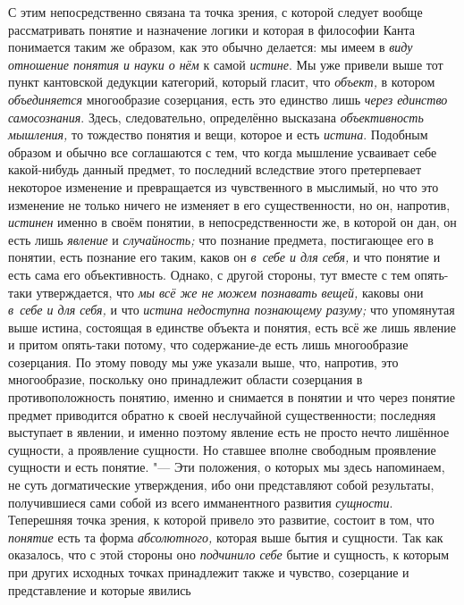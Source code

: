 С этим непосредственно связана та точка зрения, с которой
следует вообще рассматривать понятие и назначение логики и которая в
философии Канта понимается таким же образом, как это обычно делается: мы
имеем в {\em виду отношение понятия и науки о нём} к самой {\em истине}. Мы уже
привели выше тот пункт кантовской дедукции категорий, который гласит, что
{\em объект,} в котором {\em объединяется}
многообразие созерцания, есть это единство лишь
{\em через единство самосознания}. Здесь, следовательно, определённо высказана
{\em объективность мышления,} то тождество понятия и вещи, которое и есть
{\em истина}. Подобным
образом и обычно все соглашаются с тем, что когда мышление усваивает себе
какой-нибудь данный предмет, то последний вследствие этого претерпевает
некоторое изменение и превращается из чувственного в мыслимый, но что это
изменение не только ничего не изменяет в его существенности, но он,
напротив, {\em истинен}
именно в своём понятии, в непосредственности же, в которой он
дан, он есть лишь {\em явление} и {\em случайность;}
что познание предмета, постигающее его в понятии, есть
познание его таким, каков он {\em в~себе
и для себя,} и что понятие и есть сама его объективность.
Однако, с другой стороны, тут вместе с тем опять-таки
утверждается,
что {\em мы всё же не можем познавать вещей,} каковы они
{\em в~себе и для себя,} и что {\em истина
недоступна познающему разуму;} что упомянутая выше
истина, состоящая в единстве объекта и понятия, есть всё же
лишь явление и притом опять-таки потому, что содержание-де есть лишь
многообразие созерцания. По этому поводу мы уже указали выше, что,
напротив, это многообразие, поскольку оно принадлежит области созерцания в
противоположность понятию, именно и снимается в понятии и что через понятие
предмет приводится обратно к своей неслучайной существенности; последняя
выступает в явлении, и именно поэтому явление есть не просто нечто лишённое
сущности, а проявление сущности. Но ставшее вполне свободным проявление
сущности и есть понятие. "--- Эти положения, о которых мы здесь
напоминаем, не суть догматические утверждения, ибо они представляют собой
результаты, получившиеся сами собой из всего имманентного развития
{\em сущности}. Теперешняя точка зрения, к которой привело это развитие,
состоит в том, что {\em понятие} есть та форма {\em абсолютного,}
которая выше бытия и сущности. Так как оказалось, что с этой
стороны оно {\em подчинило себе}
бытие и сущность, к которым при других исходных точках
принадлежит также и чувство, созерцание и представление и которые явились
